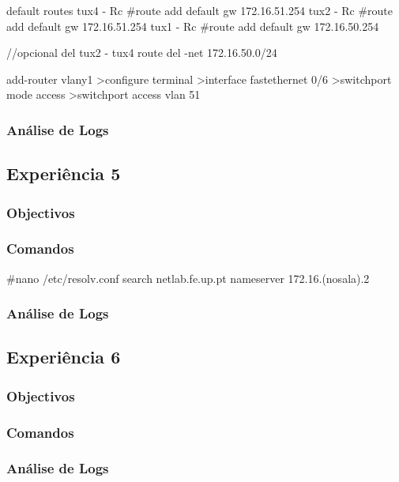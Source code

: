 \documentclass[a4paper,11pt]{article}
\begin{document}
default routes
tux4 - Rc #route add default gw 172.16.51.254
tux2 - Rc #route add default gw 172.16.51.254
tux1 - Rc #route add default gw 172.16.50.254

//opcional
del tux2 - tux4
route del -net 172.16.50.0/24

add-router vlany1
>configure terminal
>interface fastethernet 0/6
>switchport mode access
>switchport access vlan 51

\subsubsection{Análise de Logs}

\subsection{Experiência 5}
\subsubsection{Objectivos}

\subsubsection{Comandos}

#nano /etc/resolv.conf
search netlab.fe.up.pt
nameserver 172.16.(nosala).2

\subsubsection{Análise de Logs}

\subsection{Experiência 6}
\subsubsection{Objectivos}

\subsubsection{Comandos}

\subsubsection{Análise de Logs}
\end{document}
